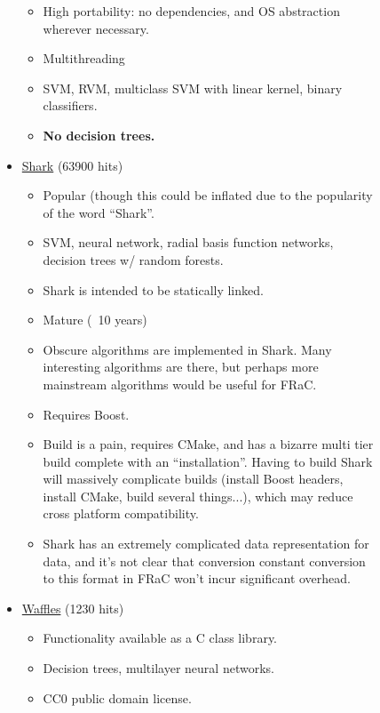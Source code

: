 \documentclass{article}
\newcommand{\CC}{C\nolinebreak\hspace{-.05em}\raisebox{.4ex}{\tiny\bf +}\nolinebreak\hspace{-.10em}\raisebox{.4ex}{\tiny\bf +}}
\newcommand*\iplus{\item[\textcolor{green}{\textbf{+}}]}
\newcommand*\iminus{\item[\textcolor{bad}{\textbf{--}}]} %
\newcommand*\ineutral{\item[\textcolor{neutral}{$\mathbf{\sim}$}]}
\begin{document}
\begin{multicols}{2}
\begin{figure}
\begin{itemize}
\begin{itemize}
\iplus High portability: no dependencies, and OS abstraction wherever necessary.

\iplus Multithreading

\iplus SVM, RVM, multiclass SVM with linear kernel, binary classifiers.

\iminus \textbf{No decision trees.}

\end{itemize}

\item \href{http://image.diku.dk/shark/sphinx_pages/build/html/index.html}{Shark} (63900 hits)

\begin{itemize}

\iplus Popular (though this could be inflated due to the popularity of the word ``Shark''.

\iplus SVM, neural network, radial basis function networks, decision trees w/ random forests.

\iplus Shark is intended to be statically linked.

\iplus Mature (~10 years)

\ineutral Obscure algorithms are implemented in Shark.  Many interesting algorithms are there, but perhaps more mainstream algorithms would be useful for FRaC.

\iminus Requires Boost.

\iminus Build is a pain, requires CMake, and has a bizarre multi tier build complete with an ``installation''.  Having to build Shark will massively complicate builds (install Boost headers, install CMake, build several things...), which may reduce cross platform compatibility.

\iminus Shark has an extremely complicated data representation for data, and it's not clear that conversion constant conversion to this format in FRaC won't incur significant overhead.

\end{itemize}

\item \href{http://www.jmlr.org/papers/volume12/gashler11a/gashler11a.pdf}{Waffles} (1230 hits)

\begin{itemize}

\iplus Functionality available as a \CC{} class library.

\iplus Decision trees, multilayer neural networks.

\iplus CC0 public domain license.


\end{itemize}
\end{itemize}
\end{figure}
\end{multicols}
\end{document}
